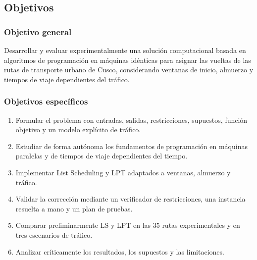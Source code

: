 \subsection{Objetivos}
\subsubsection*{Objetivo general}
Desarrollar y evaluar experimentalmente una solución computacional basada en algoritmos de programación en máquinas idénticas para asignar las vueltas de las rutas de transporte urbano de Cusco, considerando ventanas de inicio, almuerzo y tiempos de viaje dependientes del tráfico.

\subsubsection*{Objetivos específicos}
\begin{enumerate}
  \item Formular el problema con entradas, salidas, restricciones, supuestos, función objetivo y un modelo explícito de tráfico.
  \item Estudiar de forma autónoma los fundamentos de programación en máquinas paralelas y de tiempos de viaje dependientes del tiempo.
  \item Implementar List Scheduling y LPT adaptados a ventanas, almuerzo y tráfico.
  \item Validar la corrección mediante un verificador de restricciones, una instancia resuelta a mano y un plan de pruebas.
  \item Comparar preliminarmente LS y LPT en las 35 rutas experimentales y en tres escenarios de tráfico.
  \item Analizar críticamente los resultados, los supuestos y las limitaciones.
\end{enumerate}

